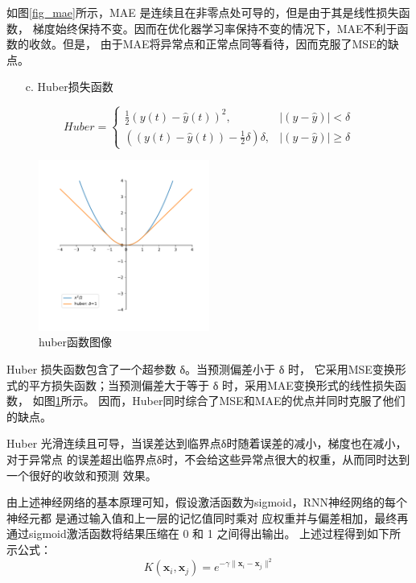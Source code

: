 \documentclass[AutoFakeBold]{LZUThesis}
\begin{document}
如图\ref{fig_mae}所示，MAE 是连续且在非零点处可导的，但是由于其是线性损失函数，
梯度始终保持不变。因而在优化器学习率保持不变的情况下，MAE不利于函数的收敛。但是，
由于MAE将异常点和正常点同等看待，因而克服了MSE的缺点。

\begin{itemize}
    \item[c. ] Huber损失函数
\end{itemize}

$$
Huber=
\left\{\begin{matrix}
    \frac{1}{2}(y\left(t\right) - \hat{y}\left(t\right))^{2}, & \left | (y - \hat{y})  \right | < \delta\\
    ((y\left(t\right) - \hat{y}\left(t\right)) - \frac1 2 \delta)\delta, & \left | (y - \hat{y})  \right | \geq \delta
\end{matrix}\right.
$$

\begin{figure}[H]
	\centering
    \includegraphics[width=0.5\textwidth]{figures/huber.pdf}
    \caption{huber函数图像}
    \label{fig_huber}
\end{figure}

Huber 损失函数包含了一个超参数 δ。当预测偏差小于 δ 时，
它采用MSE变换形式的平方损失函数；当预测偏差大于等于 δ 时，采用MAE变换形式的线性损失函数，
如图\ref{fig_huber}所示。
因而，Huber同时综合了MSE和MAE的优点并同时克服了他们的缺点。

Huber 光滑连续且可导，当误差达到临界点δ时随着误差的减小，梯度也在减小，对于异常点
的误差超出临界点δ时，不会给这些异常点很大的权重，从而同时达到一个很好的收敛和预测
效果。

由上述神经网络的基本原理可知，假设激活函数为sigmoid，RNN神经网络的每个神经元都
是通过输入值和上一层的记忆值同时乘对
应权重并与偏差相加，最终再通过sigmoid激活函数将结果压缩在 0 和 1 之间得出输出。
上述过程得到如下所示公式：
$$K(\mathbf x_i,\mathbf x_j)=e^{-\gamma\|\mathbf x_i-\mathbf x_j\|^2}$$
\end{document}
